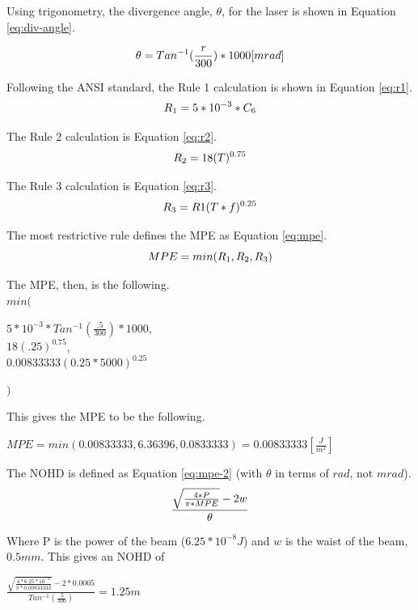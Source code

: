 \documentclass[letterpaper,10pt]{article}
\begin{document}
\begin{spacing}{1.15}
 Using trigonometry, the divergence angle, $\theta$, for the laser is shown in Equation \ref{eq:div-angle}.

 \begin{equation}\label{eq:div-angle} \large
 	\theta = Tan^{-1}(\frac{r}{300})* 1000 [mrad]
 \end{equation}
 
 Following the ANSI standard, the Rule 1 calculation is shown in Equation \ref{eq:r1}.
 \begin{equation}\label{eq:r1}
 	\large
 	R_1 = 5*10^{-3} * C_6
 \end{equation}
 
 The Rule 2 calculation is Equation \ref{eq:r2}.
 \begin{equation}\label{eq:r2}
 	\large
 	R_2 = 18 (T)^{0.75}
 \end{equation}
 
 The Rule 3 calculation is Equation \ref{eq:r3}.
 \begin{equation} \label{eq:r3}
 	\large
 	R_3 = R1(T*f)^{0.25}
 \end{equation}
 
 The most restrictive rule defines the MPE as Equation \ref{eq:mpe}.
 \begin{equation}  \label{eq:mpe}
 	\large
 	MPE = min(R_1, R_2, R_3)
 \end{equation}
 
 The MPE, then, is the following.\\
 {\large $min($}
 \begin{center}
 	\large
 	 $5*10^{-3} * Tan^{-1}(\frac{.5}{300})* 1000$,\\
 	$18 (.25)^{0.75}$,\\
 	$0.00833333 (0.25*5000)^{0.25}$
 \end{center}
 {\large $)$}
 
 This gives the MPE to be the following.
 \begin{center}
 	\large
 	$MPE = min(0.00833333, 6.36396, 0.0833333) = 0.00833333 [\frac{J}{m^2}]$
 \end{center}
 
 The NOHD is defined as Equation \ref{eq:mpe-2} (with $\theta$ in terms of $rad$, not $mrad$).
 \begin{equation} \large \label{eq:mpe-2}
 	 \frac{\sqrt{\frac{4 * P}{\pi * MPE}} - 2w}{\theta}
 \end{equation}
 
 Where P is the power of the beam ($6.25*10^{-8} J$) and $w$ is the waist of the beam, $0.5mm$. This gives an NOHD of 
 \begin{center}
 	\large
 	$ \frac{\sqrt{\frac{4 * 6.25*10^{-8} }{\pi * 0.00833333}} - 2*0.0005}{Tan^{-1}(\frac{.5}{300})} = 1.25 m$
 \end{center}
 


\end{spacing}
\end{document}
